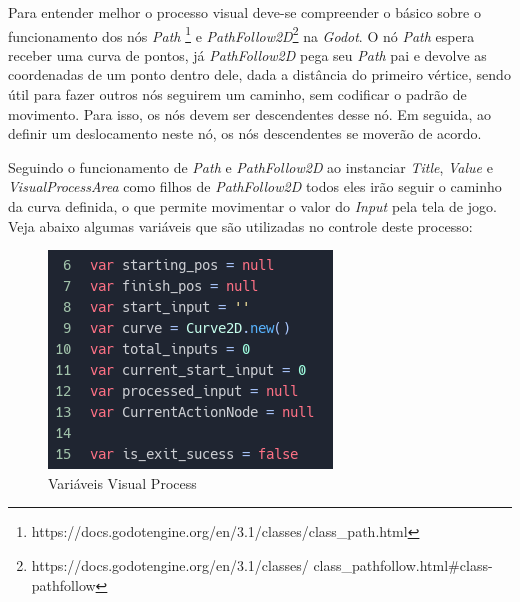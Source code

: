 Para entender melhor o processo visual deve-se compreender o básico sobre o
funcionamento dos nós \textit{Path}
\footnote{https://docs.godotengine.org/en/3.1/classes/class\_path.html} e 
\textit{PathFollow2D}\footnote{https://docs.godotengine.org/en/3.1/classes/
class\_pathfollow.html\#class-pathfollow} na \textit{Godot}.
O nó \textit{Path} espera receber uma curva de pontos, já \textit{PathFollow2D}
pega seu \textit{Path}  pai e devolve as coordenadas de um ponto dentro dele, 
dada a distância do primeiro vértice, sendo útil para fazer outros nós seguirem 
um caminho, sem codificar o padrão de movimento. Para isso, os nós devem ser 
descendentes desse nó. Em seguida, ao  definir um deslocamento neste nó, os nós 
descendentes se moverão de acordo.

Seguindo o funcionamento de \textit{Path} e \textit{PathFollow2D} ao instanciar
\textit{Title}, \textit{Value} e \textit{VisualProcessArea} como filhos de
\textit{PathFollow2D} todos eles irão seguir o caminho da curva definida, o que
permite movimentar o valor do \textit{Input} pela tela de jogo. Veja abaixo
algumas variáveis que são utilizadas no controle deste processo:

\begin{figure}[H]
    \includegraphics[scale=0.8]{../figuras/variaveis_visual_process.png}
    \caption{Variáveis Visual Process}
\end{figure}

